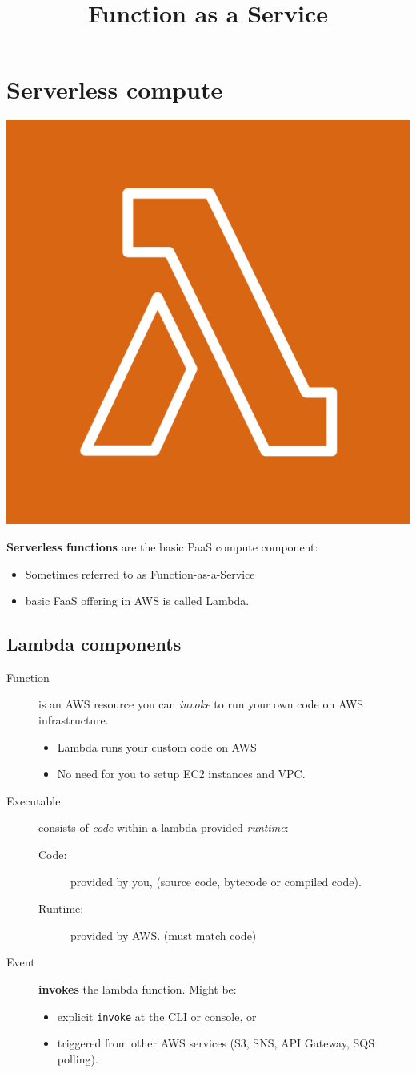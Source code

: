 \documentclass[slides]{pgnotes}
\title{Function as a Service}
\begin{document}
\maketitle

\section{Serverless compute}\label{serverless-compute}

\begin{center}
  \includegraphics[width=0.2\linewidth]{lambda_logo}
\end{center}

\textbf{Serverless functions} are the basic PaaS compute component:
\begin{itemize}
\item Sometimes referred to as Function-as-a-Service
\item basic FaaS offering in AWS is called Lambda.
\end{itemize}


\subsection{Lambda components}\label{key-components}

\begin{description}
\item[Function]
  is an AWS resource you can \emph{invoke} to run your own code on AWS infrastructure.
\begin{itemize}
\item
  Lambda runs your custom code on AWS
\item
  No need for you to setup EC2 instances and VPC.
\end{itemize}
\item[Executable]
  consists of \textit{code} within a lambda-provided \textit{runtime}:
  \begin{description}
  \item[Code:]
    provided by you, (source code, bytecode or compiled code).
  \item[Runtime:]
    provided by AWS. (must match code)
\end{description}
\item[Event] \textbf{invokes} the lambda function. Might be:
  \begin{itemize}
  \item explicit \texttt{invoke} at the CLI or console, or
  \item triggered from other AWS services (S3, SNS, API Gateway, SQS polling).
  \end{itemize}
\end{description}
\end{document}

